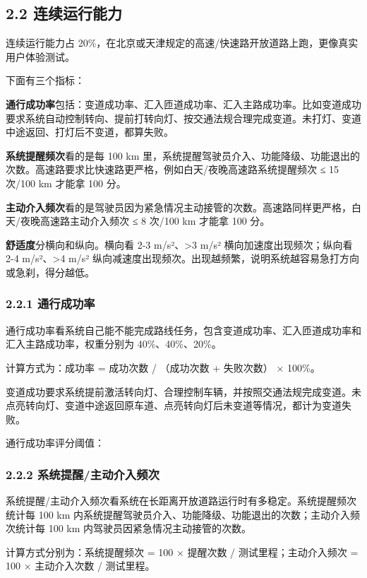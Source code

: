 \subsection{2.2 连续运行能力}

连续运行能力占 20\%，在北京或天津规定的高速/快速路开放道路上跑，更像真实用户体验测试。

下面有三个指标：

\textbf{通行成功率}包括：变道成功率、汇入匝道成功率、汇入主路成功率。比如变道成功要求系统自动控制转向、提前打转向灯、按交通法规合理完成变道。未打灯、变道中途返回、打灯后不变道，都算失败。

\textbf{系统提醒频次}看的是每 100 km 里，系统提醒驾驶员介入、功能降级、功能退出的次数。高速路要求比快速路更严格，例如白天/夜晚高速路系统提醒频次 ≤ 15 次/100 km 才能拿 100 分。

\textbf{主动介入频次}看的是驾驶员因为紧急情况主动接管的次数。高速路同样更严格，白天/夜晚高速路主动介入频次 ≤ 8 次/100 km 才能拿 100 分。

\textbf{舒适度}分横向和纵向。横向看 2-3 m/s²、>3 m/s² 横向加速度出现频次；纵向看 2-4 m/s²、>4 m/s² 纵向减速度出现频次。出现越频繁，说明系统越容易急打方向或急刹，得分越低。

\subsubsection{2.2.1 通行成功率}

通行成功率看系统自己能不能完成路线任务，包含变道成功率、汇入匝道成功率和汇入主路成功率，权重分别为 40\%、40\%、20\%。

计算方式为：成功率 = 成功次数 / （成功次数 + 失败次数） × 100\%。

变道成功要求系统提前激活转向灯、合理控制车辆，并按照交通法规完成变道。未点亮转向灯、变道中途返回原车道、点亮转向灯后未变道等情况，都计为变道失败。

通行成功率评分阈值：

\subsubsection{2.2.2 系统提醒/主动介入频次}

系统提醒/主动介入频次看系统在长距离开放道路运行时有多稳定。系统提醒频次统计每 100 km 内系统提醒驾驶员介入、功能降级、功能退出的次数；主动介入频次统计每 100 km 内驾驶员因紧急情况主动接管的次数。

计算方式分别为：系统提醒频次 = 100 × 提醒次数 / 测试里程；主动介入频次 = 100 × 主动介入次数 / 测试里程。

